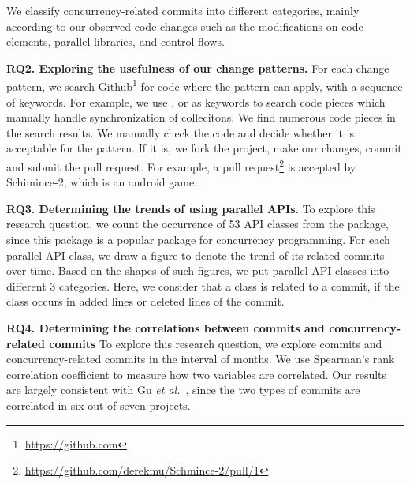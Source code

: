 We classify concurrency-related commits into different categories, mainly according to our observed code changes such as the modifications on code elements, parallel libraries, and control flows.

\textbf{RQ2. Exploring the usefulness of our change patterns.} For each change pattern, we search Github\footnote{\url{https://github.com}} for code where the pattern can apply, with a sequence of keywords. For example, we use ,  or  as keywords to search code pieces which manually handle synchronization of collecitons. We find numerous code pieces in the search results. We manually check the code and decide whether it is acceptable for the pattern. If it is, we fork the project, make our changes, commit and submit the pull request. For example, a pull request\footnote{\url{https://github.com/derekmu/Schmince-2/pull/1}} is accepted by Schimince-2, which is an android game.

\textbf{RQ3. Determining the trends of using parallel APIs.} To explore this research question, we count the occurrence of 53 API classes from the  package, since this package is a popular package for concurrency programming. For each parallel API class, we draw a figure to denote the trend of its related commits over time. Based on the shapes of such figures, we put parallel API classes into different 3 categories. Here, we consider that a class is related to a commit, if the class occurs in added lines or deleted lines of the commit.%

\textbf{RQ4. Determining the correlations between commits and concurrency-related commits} To explore this research question, we explore commits and concurrency-related commits in the interval of months. We use Spearman's rank correlation coefficient to measure how two variables are correlated. Our results are largely consistent with Gu \emph{et al.}~\cite{conf/sigsoft/GuJSZL15}, since the two types of commits are correlated in six out of seven projects.%




